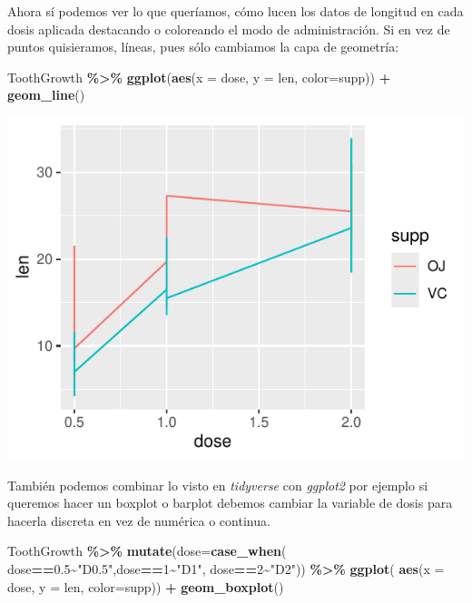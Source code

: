 \documentclass[
]{book}
\newenvironment{Shaded}{\begin{snugshade}}{\end{snugshade}}
\newcommand{\AttributeTok}[1]{\textcolor[rgb]{0.13,0.29,0.53}{#1}}
\newcommand{\DecValTok}[1]{\textcolor[rgb]{0.00,0.00,0.81}{#1}}
\newcommand{\FloatTok}[1]{\textcolor[rgb]{0.00,0.00,0.81}{#1}}
\newcommand{\FunctionTok}[1]{\textcolor[rgb]{0.13,0.29,0.53}{\textbf{#1}}}
\newcommand{\NormalTok}[1]{#1}
\newcommand{\SpecialCharTok}[1]{\textcolor[rgb]{0.81,0.36,0.00}{\textbf{#1}}}
\newcommand{\StringTok}[1]{\textcolor[rgb]{0.31,0.60,0.02}{#1}}
\begin{document}
Ahora sí podemos ver lo que queríamos, cómo lucen los datos de longitud en cada dosis aplicada destacando o coloreando el modo de administración.
Si en vez de puntos quisieramos, líneas, pues sólo cambiamos la capa de geometría:

\begin{Shaded}
\begin{Highlighting}[]
\NormalTok{ToothGrowth }\SpecialCharTok{\%\textgreater{}\%} \FunctionTok{ggplot}\NormalTok{(}\FunctionTok{aes}\NormalTok{(}\AttributeTok{x =}\NormalTok{ dose, }\AttributeTok{y =}\NormalTok{ len, }\AttributeTok{color=}\NormalTok{supp)) }\SpecialCharTok{+}
  \FunctionTok{geom\_line}\NormalTok{()}
\end{Highlighting}
\end{Shaded}

\begin{center}\includegraphics{R_Manual_files/figure-latex/unnamed-chunk-207-1} \end{center}

También podemos combinar lo visto en \emph{tidyverse} con \emph{ggplot2} por ejemplo si queremos hacer un boxplot o barplot debemos cambiar la variable de dosis para hacerla discreta en vez de numérica o continua.

\begin{Shaded}
\begin{Highlighting}[]
\NormalTok{ToothGrowth }\SpecialCharTok{\%\textgreater{}\%}  \FunctionTok{mutate}\NormalTok{(}\AttributeTok{dose=}\FunctionTok{case\_when}\NormalTok{(}
\NormalTok{  dose}\SpecialCharTok{==}\FloatTok{0.5}\SpecialCharTok{\textasciitilde{}}\StringTok{"D0.5"}\NormalTok{,dose}\SpecialCharTok{==}\DecValTok{1}\SpecialCharTok{\textasciitilde{}}\StringTok{"D1"}\NormalTok{, dose}\SpecialCharTok{==}\DecValTok{2}\SpecialCharTok{\textasciitilde{}}\StringTok{"D2"}\NormalTok{)) }\SpecialCharTok{\%\textgreater{}\%} \FunctionTok{ggplot}\NormalTok{(}
    \FunctionTok{aes}\NormalTok{(}\AttributeTok{x =}\NormalTok{ dose, }\AttributeTok{y =}\NormalTok{ len, }\AttributeTok{color=}\NormalTok{supp)) }\SpecialCharTok{+}  \FunctionTok{geom\_boxplot}\NormalTok{()}
\end{Highlighting}
\end{Shaded}
\end{document}

